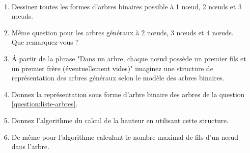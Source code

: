 \documentclass{../cours}
\begin{document}
\begin{exercice}

~
\begin{enumerate}
\item Dessinez toutes les formes d'arbres binaires possible à 1 nœud, 2 nœuds et 3 nœuds.
\item Même question pour les arbres généraux à 2 nœuds, 3 nœuds et 4 nœuds. Que remarquez-vous ?
\label{question:liste-arbres}
\item \'A partir de la phrase "Dans un arbre, chaque nœud possède un premier fils et un premier frère (éventuellement vides)" imaginez une structure de représentation des arbres généraux selon le modèle des arbres binaires.
\item Donnez la représentation sous forme d'arbre binaire des arbres de la question \ref{question:liste-arbres}.
\item Donnez l'algorithme du calcul de la hauteur en utilisant cette structure. 
\item De même pour l'algorithme calculant le nombre maximal de fils d'un nœud dans l'arbre.
\end{enumerate}
\end{exercice}

%
%
%
%
%
%
%
\end{document}
